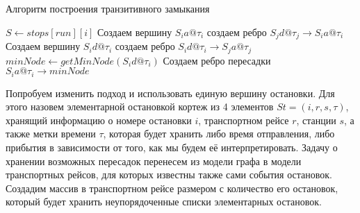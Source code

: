 \begin{algorithm}[!h]
	\caption{Алгоритм построения транзитивного замыкания}\label{lst3}
	\begin{algorithmic}
		\State $S \gets stops[run][i]$ 
		\State Создаем вершину $S_ia@\tau_i$
		\State создаем ребро $S_jd@\tau_j \rightarrow S_ia@\tau_i$
		\EndFor
		\State Создаем вершину $S_id@\tau_i$
		\State создаем ребро $S_id@\tau_i \rightarrow S_ja@\tau_j$
		\EndFor
		\State $minNode \gets getMinNode(S_id@\tau_i)$ 
		\State Создаем ребро пересадки $S_ia@\tau_i \rightarrow minNode$
		\EndFor
		\EndFor
		\EndFunction
	\end{algorithmic}
\end{algorithm}

Попробуем изменить подход и использовать единую вершину остановки. Для этого назовем элементарной остановкой кортеж из 4 элементов $St=(i, r, s, \tau)$, хранящий информацию о номере остановки $i$, транспортном рейсе $r$, станции $s$, а также метки времени $\tau$, которая будет хранить либо время отправления, либо прибытия в зависимости от того, как мы будем её интерпретировать. Задачу о хранении возможных пересадок перенесем из модели графа в модели транспортных рейсов, для которых известны также сами события остановок. Создадим массив в транспортном рейсе размером с количество его остановок, который будет хранить неупорядоченные списки элементарных остановок.

